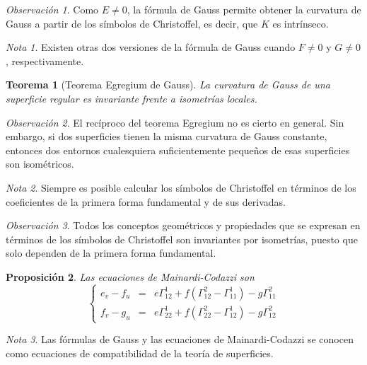 \documentclass{report}
\newtheorem{theorem}{Teorema}[chapter]
\newtheorem{proposition}[theorem]{Proposición}
\theoremstyle{remark}
\newtheorem*{remark}{Observación}
\theoremstyle{remark}
\newtheorem*{note}{Nota}
\theoremstyle{definition}
\theoremstyle{definition}
\theoremstyle{definition}
\begin{document}
\begin{remark}
    Como $E \neq 0$, la fórmula de Gauss permite obtener la curvatura de Gauss a partir de los símbolos de Christoffel, es decir, que $K$ es intrínseco.
\end{remark}

\begin{note}
    Existen otras dos versiones de la fórmula de Gauss cuando $F \neq 0$ y $G \neq 0$, respectivamente.
\end{note}

\begin{theorem}[Teorema Egregium de Gauss]
    La curvatura de Gauss de una superficie regular es invariante frente a isometrías locales.
\end{theorem}

\begin{remark}
    El recíproco del teorema Egregium no es cierto en general.
    Sin embargo, si dos superficies tienen la misma curvatura de Gauss constante, entonces dos entornos cualesquiera suficientemente pequeños de esas superficies son isométricos.
\end{remark}

\begin{note}
    Siempre es posible calcular los símbolos de Christoffel en términos de los coeficientes de la primera forma fundamental y de sus derivadas.
\end{note}

\begin{remark}
    Todos los conceptos geométricos y propiedades que se expresan en términos de los símbolos de Christoffel son invariantes por isometrías, puesto que solo dependen de la primera forma fundamental.
\end{remark}

\begin{proposition}
    Las ecuaciones de Mainardi-Codazzi son
    $$\left\{
        \begin{array}{lcl}
            e_v - f_u & = & e\Gamma^1_{12} + f(\Gamma^2_{12} - \Gamma^1_{11}) - g\Gamma^2_{11} \\
            f_v - g_u & = & e\Gamma^1_{22} + f(\Gamma^2_{22} - \Gamma^1_{12}) - g\Gamma^2_{12}
        \end{array}
        \right.$$
\end{proposition}

\begin{note}
    Las fórmulas de Gauss y las ecuaciones de Mainardi-Codazzi se conocen como ecuaciones de compatibilidad de la teoría de superficies.
\end{note}
\end{document}
